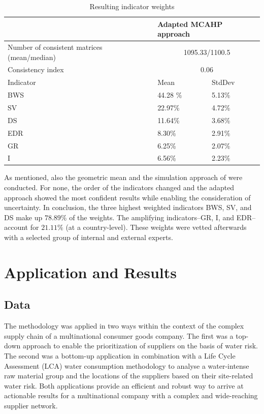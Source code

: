 \documentclass[a4paper]{article}
\begin{document}
\begin{table}
\caption{Resulting indicator weights}
\centering
\begin{tabular} {p{4cm} l l} \\ 
\toprule
	 &	\multicolumn{2}{l}{Adapted MCAHP approach} \\
\midrule 	
Number of consistent matrices (mean/median) & \multicolumn{2}{c}{1095.33/1100.5}\\
Consistency index							& \multicolumn{2}{c}{0.06}\\
Indicator									& Mean & StdDev\\
BWS											& 44.28 \% 	& 5.13\% \\
SV											& 22.97\% & 4.72\%\\
DS	& 11.64\% & 3.68\%\\
EDR	& 8.30\%  & 2.91\%\\	
GR 	& 6.25\%  & 2.07\%\\
I	& 6.56\%  & 2.23\%\\
\bottomrule
\end{tabular}
\end{table} 

As mentioned, also the geometric mean and the simulation approach of \citep{Ataei:2013} were conducted.
For none, the order of the indicators changed and the adapted approach showed the most confident results while enabling the consideration of uncertainty.
In conclusion, the three highest weighted indicators BWS, SV, and DS make up $78.89\%$ of the weights. 
The amplifying indicators--GR, I, and EDR--account for $21.11\%$  (at a country-level). 
These weights were vetted afterwards with a selected group of internal and external experts.


\section{Application and Results}
\subsection{Data}
The methodology was applied in two ways within the context of the complex supply chain of a multinational consumer goods company. 
The first was a top-down approach to enable the prioritization of suppliers on the basis of water risk. 
The second was a bottom-up application in combination with a Life Cycle Assessment (LCA) water consumption methodology to analyse a water-intense raw material group and the locations of the suppliers based on their site-related water risk. 
Both applications provide an efficient and robust way to arrive at actionable results for a multinational company with a complex and wide-reaching supplier network.
 
\end{document}
